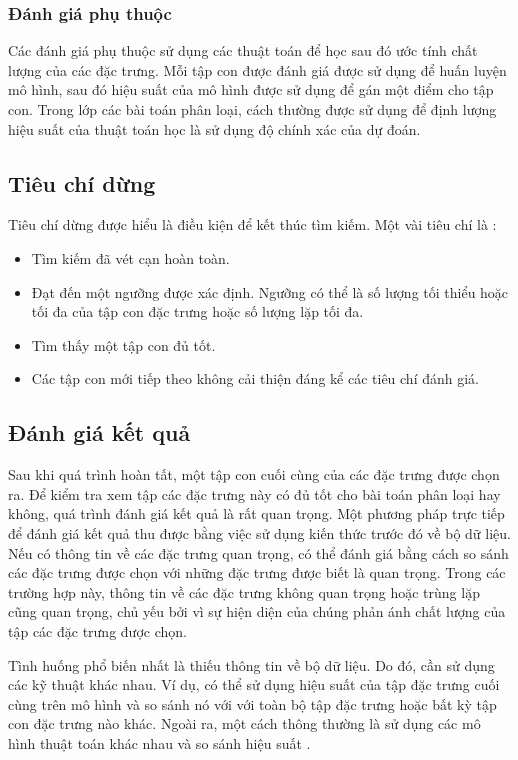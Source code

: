 \subsubsection{Đánh giá phụ thuộc}
Các đánh giá phụ thuộc sử dụng các thuật toán để học sau đó ước tính chất lượng của các đặc trưng. Mỗi tập con được đánh giá được sử dụng để huấn luyện mô hình, sau đó hiệu suất của mô hình được sử dụng để gán một điểm cho tập con. Trong lớp các bài toán phân loại, cách thường được sử dụng để định lượng hiệu suất của thuật toán học là sử dụng độ chính xác của dự đoán.

\subsection{Tiêu chí dừng}
Tiêu chí dừng được hiểu là điều kiện để kết thúc tìm kiếm. Một vài tiêu chí là \cite{kumar2014feature}:
\begin{itemize}
	\item Tìm kiếm đã vét cạn hoàn toàn.
	\item Đạt đến một ngưỡng được xác định. Ngưỡng có thể là số lượng tối thiểu hoặc tối đa của tập con đặc trưng hoặc số lượng lặp tối đa.
	\item Tìm thấy một tập con đủ tốt.
	\item Các tập con mới tiếp theo không cải thiện đáng kể các tiêu chí đánh giá.
\end{itemize}

\subsection{Đánh giá kết quả}
Sau khi quá trình hoàn tất, một tập con cuối cùng của các đặc trưng được chọn ra. Để kiểm tra xem tập các đặc trưng này có đủ tốt cho bài toán phân loại hay không, quá trình đánh giá kết quả là rất quan trọng. Một phương pháp trực tiếp để đánh giá kết quả thu được bằng việc sử dụng kiến thức trước đó về bộ dữ liệu. Nếu có thông tin về các đặc trưng quan trọng, có thể đánh giá bằng cách so sánh các đặc trưng được chọn với những đặc trưng được biết là quan trọng. Trong các trường hợp này, thông tin về các đặc trưng không quan trọng hoặc trùng lặp cũng quan trọng, chủ yếu bởi vì sự hiện diện của chúng phản ánh chất lượng của tập các đặc trưng được chọn.

Tình huống phổ biến nhất là thiếu thông tin về bộ dữ liệu. Do đó, cần sử dụng các kỹ thuật khác nhau. Ví dụ, có thể sử dụng hiệu suất của tập đặc trưng cuối cùng trên mô hình và so sánh nó với với toàn bộ tập đặc trưng hoặc bất kỳ tập con đặc trưng nào khác. Ngoài ra, một cách thông thường là sử dụng các mô hình thuật toán khác nhau và so sánh hiệu suất \cite{chen2006combining}.

